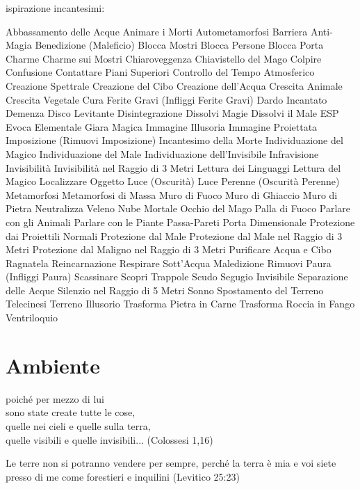 \documentclass[12pt,a4paper,twoside,openany]{book}
\begin{document}
\begin{multicols}{2}
ispirazione incantesimi:

Abbassamento delle Acque
Animare i Morti
Autometamorfosi
Barriera Anti-Magia
Benedizione (Maleficio)
Blocca Mostri
Blocca Persone
Blocca Porta
Charme
Charme sui Mostri
Chiaroveggenza
Chiavistello del Mago
Colpire
Confusione
Contattare Piani Superiori
Controllo del Tempo Atmosferico
Creazione Spettrale
Creazione del Cibo
Creazione dell’Acqua
Crescita Animale
Crescita Vegetale
Cura Ferite Gravi (Infliggi Ferite Gravi)
Dardo Incantato
Demenza
Disco Levitante
Disintegrazione
Dissolvi Magie
Dissolvi il Male
ESP
Evoca Elementale
Giara Magica
Immagine Illusoria
Immagine Proiettata
Imposizione (Rimuovi Imposizione)
Incantesimo della Morte
Individuazione del Magico
Individuazione del Male
Individuazione dell'Invisibile
Infravisione
Invisibilità
Invisibilità nel Raggio di 3 Metri
Lettura dei Linguaggi
Lettura del Magico
Localizzare Oggetto
Luce (Oscurità)
Luce Perenne (Oscurità Perenne)
Metamorfosi
Metamorfosi di Massa
Muro di Fuoco
Muro di Ghiaccio
Muro di Pietra
Neutralizza Veleno
Nube Mortale
Occhio del Mago
Palla di Fuoco
Parlare con gli Animali
Parlare con le Piante
Passa-Pareti
Porta Dimensionale
Protezione dai Proiettili Normali
Protezione dal Male
Protezione dal Male nel Raggio di 3 Metri
Protezione dal Maligno nel Raggio di 3 Metri
Purificare Acqua e Cibo
Ragnatela
Reincarnazione
Respirare Sott’Acqua
Maledizione
Rimuovi Paura (Infliggi Paura)
Scassinare
Scopri Trappole
Scudo
Segugio Invisibile
Separazione delle Acque
Silenzio nel Raggio di 5 Metri
Sonno
Spostamento del Terreno
Telecinesi
Terreno Illusorio
Trasforma Pietra in Carne
Trasforma Roccia in Fango
Ventriloquio




\end{multicols}

\pagebreak

\section{Ambiente}

\label{ambiente}
\begin{changemargin}{0.3cm}{0.3cm}\begin{enfasi}{
poiché per mezzo di lui\\
sono state create tutte le cose,\\
quelle nei cieli e quelle sulla terra,\\
quelle visibili e quelle invisibili... (Colossesi 1,16)\\\medskip

Le terre non si potranno vendere per sempre, perché la terra è mia e voi siete presso di me come forestieri e inquilini (Levitico 25:23)
}\end{enfasi}\end{changemargin}\medskip
\end{document}
